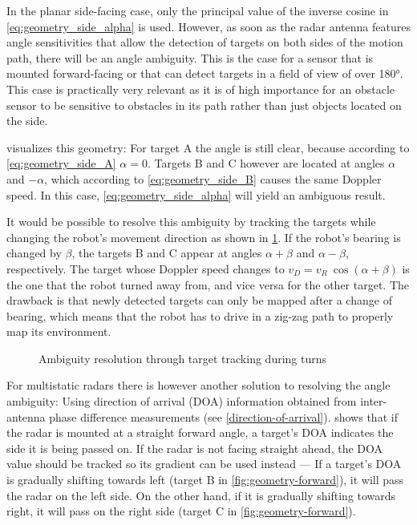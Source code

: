 In the planar side-facing case, only the principal value of the inverse cosine in \cref{eq:geometry_side_alpha} is used. However, as soon as the radar antenna features angle sensitivities that allow the detection of targets on both sides of the motion path, there will be an angle ambiguity. This is the case for a sensor that is mounted forward-facing or that can detect targets in a field of view of over 180°. This case is practically very relevant as it is of high importance for an obstacle sensor to be sensitive to obstacles in its path rather than just objects located on the side.

 visualizes this geometry: For target A the angle is still clear, because according to \cref{eq:geometry_side_A} $\alpha = 0$. Targets B and C however are located at angles $\alpha$ and $-\alpha$, which according to \cref{eq:geometry_side_B} causes the same Doppler speed. In this case, \cref{eq:geometry_side_alpha} will yield an ambiguous result.

It would be possible to resolve this ambiguity by tracking the targets while changing the robot's movement direction as shown in \cref{fig:geometry-turn}. If the robot's bearing is changed by $\beta$, the targets B and C appear at angles $\alpha+\beta$ and $\alpha-\beta$, respectively. The target whose Doppler speed changes to $v_D = v_R~\cos(\alpha+\beta)$ is the one that the robot turned away from, and vice versa for the other target. The drawback is that newly detected targets can only be mapped after a change of bearing, which means that the robot has to drive in a zig-zag path to properly map its environment.

\begin{figure}
    \centering
    \def\svgwidth{0.5\linewidth}
    
    \caption{Ambiguity resolution through target tracking during turns}
    \label{fig:geometry-turn}
\end{figure}

For multistatic radars there is however another solution to resolving the angle ambiguity: Using direction of arrival (DOA) information obtained from inter-antenna phase difference measurements (see \cref{direction-of-arrival}).  shows that if the radar is mounted at a straight forward angle, a target's DOA indicates the side it is being passed on. If the radar is not facing straight ahead, the DOA value should be tracked so its gradient can be used instead --- If a target's DOA is gradually shifting towards left (target B in \cref{fig:geometry-forward}), it will pass the radar on the left side. On the other hand, if it is gradually shifting towards right, it will pass on the right side (target C in \cref{fig:geometry-forward}).

